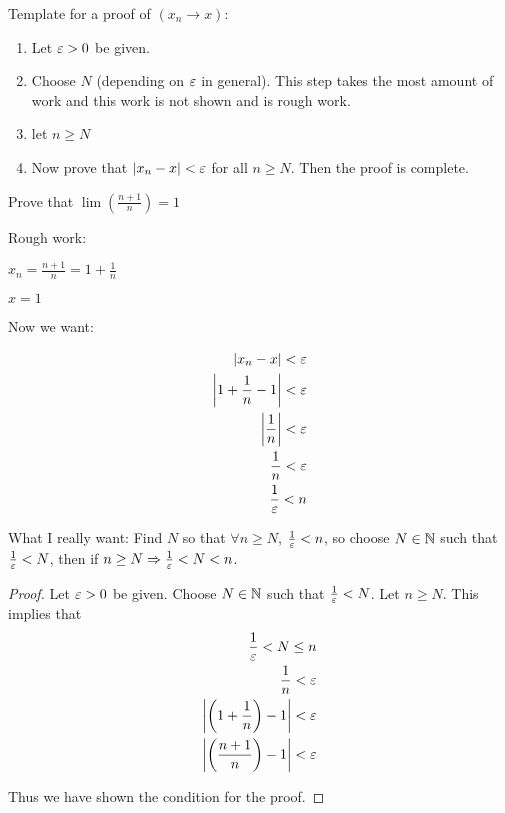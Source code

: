 
\begin{eg}
	Template for a proof of $\left( x_n \to x \right) $:
\end{eg}


\begin{enumerate}
	\item Let $\e > 0$ be given.
	\item Choose  $N$ (depending on $\e$ in general). This step takes the most amount of work and this work is not shown and is rough work.
	\item let $n \ge N$ 
	\item Now prove that $\left|x_n - x\right| < \e$ for all $n \ge N$. Then the proof is complete.
\end{enumerate}
	
\begin{eg}
	Prove that $\lim \left(\frac{n+1}{n}  \right) = 1$
\end{eg}

Rough work:

$x_n = \frac{n+1}{n} = 1 + \frac{1}{n}$ 

$x = 1$

Now we want: 

\begin{align}
	\left|x_n - x\right| < \e\\
	\left|1 + \frac{1}{n} - 1\right| < \e \\
	\left|\frac{1}{n}\right| < \e \\
	\frac{1}{n} < \e \\ 
	\frac{1}{\e} < n \\
\end{align}

What I really want: Find $N$ so that $\forall n \ge N$, $\frac{1}{\e} < n$, so choose $N \in \mathbb{N}$ such that $\frac{1}{\e} < N$, then if $n \ge N \implies \frac{1}{\e} < N < n$.



\begin{proof}
	Let $\e > 0$ be given. Choose $N \in \mathbb{N}$ such that $\frac{1}{\e} < N$. Let $n \ge N$. This implies that
	\begin{align}
		\frac{1}{\e} < N \le n \\
		\frac{1}{n} < \e \\
		\left|\left( 1+ \frac{1}{n} \right) - 1\right| < \e \\
		\left|\left( \frac{n+1}{n} \right) - 1\right| < \e \\
	\end{align}

	Thus we have shown the condition for the proof.
\end{proof}

